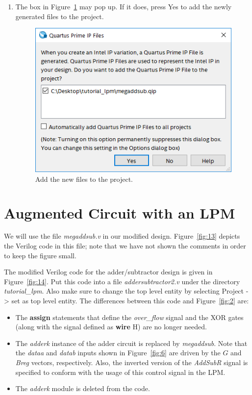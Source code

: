\documentclass[11pt, twoside, pdftex]{article}
\begin{document}
\begin{enumerate}
\item The box in Figure~\ref{fig:12} may pop up. If it does, press {\sf Yes} to add the newly generated files
to the project.

\begin{figure}[H]
   \begin{center}
      \includegraphics[scale=0.65]{figures/figure12.png}
   \caption{Add the new files to the project.} 
	 \label{fig:12}
	 \end{center}
\end{figure}  

\end{enumerate}
\newpage
\section{Augmented Circuit with an LPM}

We will use the file {\it megaddsub.v} in our modified design.
Figure~\ref{fig:13} depicts the Verilog code in this file; note that we have not shown 
the comments in order to keep the figure small.


\newpage
The modified Verilog code for the adder/subtractor design is given in Figure~\ref{fig:14}.
Put this code into a file
{\it addersubtractor2.v} under the directory {\it tutorial\_lpm}. Also make sure to change the top level entity by selecting Project -> set as top level entity.
The differences between this code and Figure~\ref{fig:2} are:
\begin{itemize}
\item The {\bf assign} statements that define the {\it over\_flow} signal 
and the XOR gates (along with the signal defined as {\bf wire} H)
are no longer needed.
\item The {\it adderk} instance of the adder circuit is replaced 
by {\it megaddsub}. Note that the {\it dataa} and {\it datab} inputs shown 
in Figure~\ref{fig:6} are driven by the $G$ and {\it Breg} vectors, respectively. 
Also, the inverted version of the {\it AddSubR} signal is specified to 
conform with the usage of this control signal in the LPM.
\item The {\it adderk} module is deleted from the code.
\end{itemize}

\newpage

\end{document}
